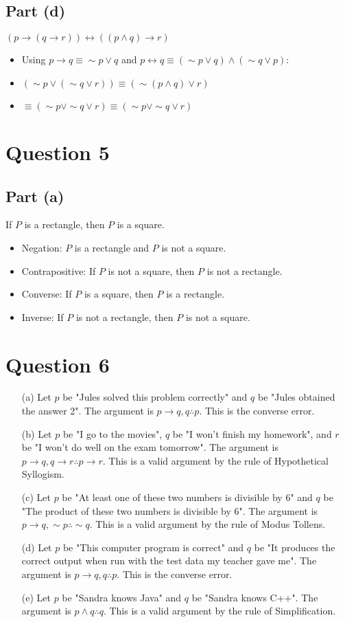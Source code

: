 \documentclass{article}
\begin{document}
\subsection{Part (d)}
$(p \to (q \to r)) \leftrightarrow ((p \land q) \to r)$
\begin{itemize}
    \item Using $p \to q \equiv \sim p \lor q$ and $p \leftrightarrow q \equiv (\sim p \lor q) \land (\sim q \lor p)$: 
    \item $(\sim p \lor (\sim q \lor r)) \equiv (\sim(p \land q) \lor r)$
    \item $\equiv (\sim p \lor \sim q \lor r) \equiv (\sim p \lor \sim q \lor r)$
\end{itemize}

\section{Question 5}
\subsection{Part (a)}
If $P$ is a rectangle, then $P$ is a square.
\begin{itemize}
    \item Negation: $P$ is a rectangle and $P$ is not a square.
    \item Contrapositive: If $P$ is not a square, then $P$ is not a rectangle.
    \item Converse: If $P$ is a square, then $P$ is a rectangle.
    \item Inverse: If $P$ is not a rectangle, then $P$ is not a square.
\end{itemize}

\section{Question 6}
\begin{enumerate}
    \item[(a)] Let $p$ be "Jules solved this problem correctly" and $q$ be "Jules obtained the answer 2". The argument is $p \to q, q \therefore p$. This is the converse error.
    \item[(b)] Let $p$ be "I go to the movies", $q$ be "I won’t finish my homework", and $r$ be "I won’t do well on the exam tomorrow". The argument is $p \to q, q \to r \therefore p \to r$. This is a valid argument by the rule of Hypothetical Syllogism.
    \item[(c)] Let $p$ be "At least one of these two numbers is divisible by 6" and $q$ be "The product of these two numbers is divisible by 6". The argument is $p \to q, \sim p \therefore \sim q$. This is a valid argument by the rule of Modus Tollens.
    \item[(d)] Let $p$ be "This computer program is correct" and $q$ be "It produces the correct output when run with the test data my teacher gave me". The argument is $p \to q, q \therefore p$. This is the converse error.
    \item[(e)] Let $p$ be "Sandra knows Java" and $q$ be "Sandra knows C++". The argument is $p \land q \therefore q$. This is a valid argument by the rule of Simplification.
\end{enumerate}
\end{document}
